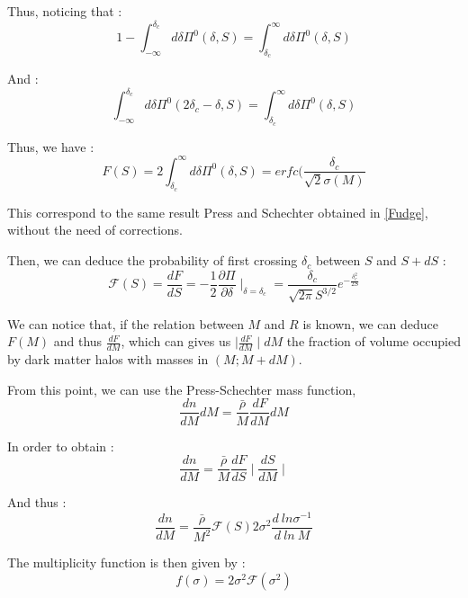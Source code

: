 Thus, noticing that :
\begin{equation}
1 - \int^{\delta_c}_{-\infty} d\delta \Pi^0 (\delta, S) = \int_{\delta_c}^{\infty} d\delta \Pi^0 (\delta, S)
\end{equation}

And :
\begin{equation}
\int^{\delta_c}_{-\infty} d\delta \Pi^0 (2\delta_c - \delta, S) = \int_{\delta_c}^{\infty} d\delta \Pi^0 (\delta, S)
\end{equation}

Thus, we have :
\begin{equation}
\label{Frac Final}
F(S) = 2 \int_{\delta_c}^{\infty} d\delta \Pi^0 (\delta, S) = erfc(\frac{\delta_c}{\sqrt{2}\sigma(M)}
\end{equation}

This correspond to the same result Press and Schechter obtained in \ref{Fudge}, without the need of corrections.

Then, we can deduce the probability of first crossing $\delta_c$ between $S$ and $S + dS$  :
\begin{equation}
\label{Proba First Crossing}
\mathcal{F}(S) = \frac{dF}{dS} = -\frac{1}{2} \frac{\partial \Pi}{\partial \delta} \mid_{\delta = \delta_c} = \frac{\delta_c}{\sqrt{2\pi}S^{3/2}} e^{-\frac{\delta_c^2}{2S} }
\end{equation}

We can notice that, if the relation between $M$ and $R$ is known, we can deduce $F(M)$ and thus $\frac{dF}{dM}$, which can gives us $\mid \frac{dF}{dM} \mid dM$ the fraction of volume occupied by dark matter halos with masses in $(M ; M + dM)$.

From this point, we can use the Press-Schechter mass function,
\begin{equation}
\frac{dn}{dM}dM = \frac{\bar{\rho}}{M} \frac{dF}{dM} dM
\end{equation}

In order to obtain :
\begin{equation}
\label{PS Hmf EST}
\frac{dn}{dM} = \frac{\bar{\rho}}{M} \frac{dF}{dS} \mid \frac{dS}{dM} \mid
\end{equation}

And thus :
\begin{equation}
\label{PS Hmf EST 2}
\frac{dn}{dM} = \frac{\bar{\rho}}{M^2} \mathcal{F}(S) 2\sigma^2 \frac{d \ ln \sigma^{-1}}{d\ ln \ M}
\end{equation}

The multiplicity function is then given by :
\begin{equation}
\label{Multiplicity Func}
f(\sigma) = 2 \sigma^2 \mathcal{F}(\sigma^2)
\end{equation}

